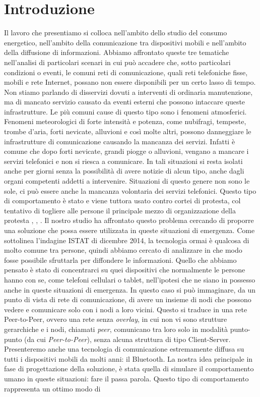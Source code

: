 \chapter{Introduzione}
\label{chap:Introduzione}

Il lavoro che presentiamo si colloca nell'ambito dello studio del consumo energetico, nell'ambito della comunicazione tra dispositivi mobili e nell'ambito della diffusione di informazioni. Abbiamo affrontato queste tre tematiche nell'analisi di particolari scenari in cui può accadere che, sotto particolari condizioni o eventi, le comuni reti di comunicazione, quali reti telefoniche fisse, mobili e rete Internet, possano non essere disponibili per un certo lasso di tempo. Non stiamo parlando di disservizi dovuti a interventi di ordinaria manutenzione, ma di mancato servizio causato da eventi esterni che possono intaccare queste infrastrutture. Le più comuni cause di questo tipo sono i fenomeni atmosferici. Fenomeni meteorologici di forte intensità e potenza, come nubifragi, tempeste, trombe d'aria, forti nevicate, alluvioni e così molte altri, possono danneggiare le infrastrutture di comunicazione causando la mancanza dei servizi. Infatti è comune che dopo forti nevicate, grandi piogge o alluvioni, vengano a mancare i servizi telefonici e non si riesca a comunicare. In tali situazioni si resta isolati anche per giorni senza la possibilità di avere notizie di alcun tipo, anche dagli organi competenti addetti a intervenire. Situazioni di questo genere non sono le sole, ci può essere anche la mancanza volontaria dei servizi telefonici. Questo tipo di comportamento è stato e viene tuttora usato contro cortei di protesta, col tentativo di togliere alle persone il principale mezzo di organizzazione della protesta \cite{wemakehistory2014-articolo}, \cite{wemakehistory2014-fattoq}, \cite{wemakehistory2014-lastampa}. Il nostro studio ha affrontato questo problema cercando di proporre una soluzione che possa essere utilizzata in queste situazioni di emergenza. Come sottolinea l'indagine ISTAT di dicembre 2014\cite{istat2014}, la tecnologia ormai è qualcosa di molto comune tra persone, quindi abbiamo cercato di analizzare in che modo fosse possibile sfruttarla per diffondere le informazioni. Quello che abbiamo pensato è stato di concentrarci su quei dispositivi che normalmente le persone hanno con se, come telefoni cellulari o tablet, nell'ipotesi che ne siano in possesso anche in queste situazioni di emergenza. In questo caso si può immaginare, da un punto di vista di rete di comunicazione, di avere un insieme di nodi che possono vedere e comunicare solo con i nodi a loro vicini. Questo si traduce in una rete Peer-to-Peer, ovvero una rete senza \textit{overlay}, in cui non vi sono strutture gerarchiche e i nodi, chiamati \textit{peer}, comunicano tra loro solo in modalità punto-punto (da cui \textit{Peer-to-Peer}), senza alcuna struttura di tipo Client-Server. Presenteremo anche una tecnologia di comunicazione estremamente diffusa su tutti i dispositivi mobili da molti anni: il Bluetooth. La nostra idea principale in fase di progettazione della soluzione, è stata quella di simulare il comportamento umano in queste situazioni: fare il passa parola. Questo tipo di comportamento rappresenta un ottimo modo di 